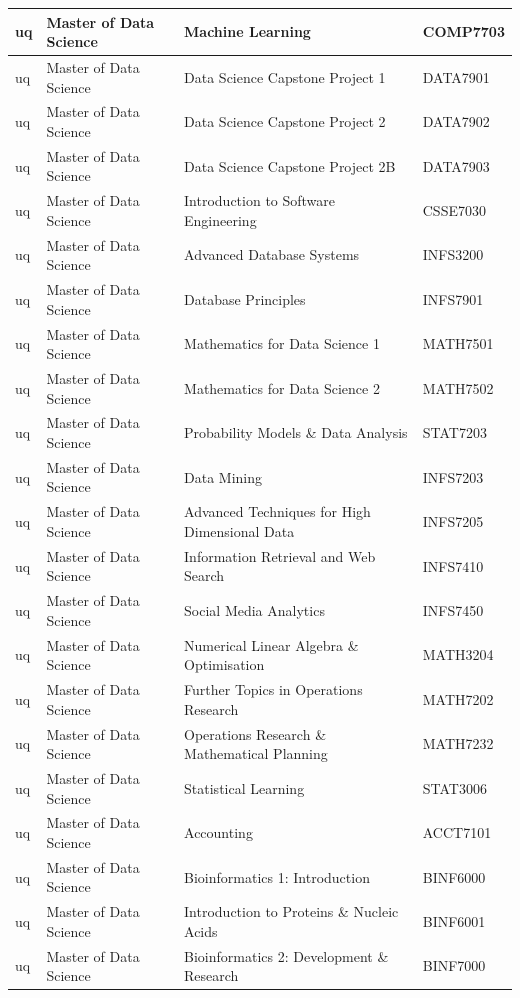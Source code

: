\documentclass[
  letterpaper,
  DIV=11,
  numbers=noendperiod]{scrreport}
\begin{document}
\begin{table}
\begin{tabular}{l|l|l|l}
\hline
uq & Master of Data Science & Machine Learning & COMP7703\\
\hline
uq & Master of Data Science & Data Science Capstone Project 1 & DATA7901\\
\hline
uq & Master of Data Science & Data Science Capstone Project 2 & DATA7902\\
\hline
uq & Master of Data Science & Data Science Capstone Project 2B & DATA7903\\
\hline
uq & Master of Data Science & Introduction to Software Engineering & CSSE7030\\
\hline
uq & Master of Data Science & Advanced Database Systems & INFS3200\\
\hline
uq & Master of Data Science & Database Principles & INFS7901\\
\hline
uq & Master of Data Science & Mathematics for Data Science 1 & MATH7501\\
\hline
uq & Master of Data Science & Mathematics for Data Science 2 & MATH7502\\
\hline
uq & Master of Data Science & Probability Models \& Data Analysis & STAT7203\\
\hline
uq & Master of Data Science & Data Mining & INFS7203\\
\hline
uq & Master of Data Science & Advanced Techniques for High Dimensional Data & INFS7205\\
\hline
uq & Master of Data Science & Information Retrieval and Web Search & INFS7410\\
\hline
uq & Master of Data Science & Social Media Analytics & INFS7450\\
\hline
uq & Master of Data Science & Numerical Linear Algebra \& Optimisation & MATH3204\\
\hline
uq & Master of Data Science & Further Topics in Operations Research & MATH7202\\
\hline
uq & Master of Data Science & Operations Research \& Mathematical Planning & MATH7232\\
\hline
uq & Master of Data Science & Statistical Learning & STAT3006\\
\hline
uq & Master of Data Science & Accounting & ACCT7101\\
\hline
uq & Master of Data Science & Bioinformatics 1: Introduction & BINF6000\\
\hline
uq & Master of Data Science & Introduction to Proteins \& Nucleic Acids & BINF6001\\
\hline
uq & Master of Data Science & Bioinformatics 2: Development \& Research & BINF7000\\

\end{tabular}
\end{table}
\end{document}
